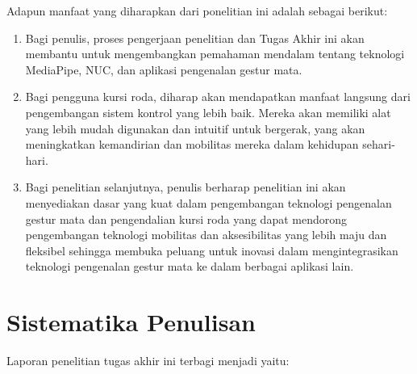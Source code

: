 
Adapun manfaat yang diharapkan dari ponelitian ini adalah sebagai berikut:

\begin{enumerate}[nolistsep]

  \item Bagi penulis, proses pengerjaan penelitian dan Tugas Akhir ini akan membantu untuk mengembangkan pemahaman mendalam tentang teknologi MediaPipe, NUC, dan aplikasi pengenalan gestur mata.
  \item Bagi pengguna kursi roda, diharap akan mendapatkan manfaat langsung dari pengembangan sistem kontrol yang lebih baik. Mereka akan memiliki alat yang lebih mudah digunakan dan intuitif untuk bergerak, yang akan meningkatkan kemandirian dan mobilitas mereka dalam kehidupan sehari-hari.
  \item Bagi penelitian selanjutnya, penulis berharap penelitian ini akan menyediakan dasar yang kuat dalam pengembangan teknologi pengenalan gestur mata dan pengendalian kursi roda yang dapat mendorong pengembangan teknologi mobilitas dan aksesibilitas yang lebih maju dan fleksibel sehingga membuka peluang untuk inovasi dalam mengintegrasikan teknologi pengenalan gestur mata ke dalam berbagai aplikasi lain.

\end{enumerate}

\section{Sistematika Penulisan}
\label{sec:sistematikapenulisan}

Laporan penelitian tugas akhir ini terbagi menjadi \lipsum[1][1-3] yaitu:

